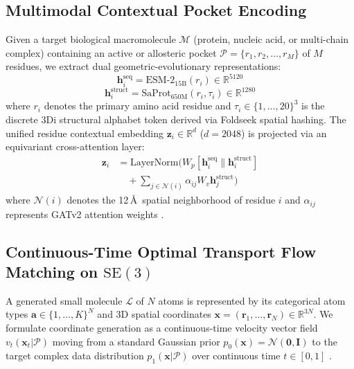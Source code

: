 \documentclass[10pt,journal,compsoc]{IEEEtran}
\begin{document}
\subsection{Multimodal Contextual Pocket Encoding}
Given a target biological macromolecule $\mathcal{M}$ (protein, nucleic acid, or multi-chain complex) containing an active or allosteric pocket $\mathcal{P} = \{r_1, r_2, \dots, r_M\}$ of $M$ residues, we extract dual geometric-evolutionary representations:
\begin{equation}
\mathbf{h}_i^{\text{seq}} = \text{ESM-2}_{15\text{B}}(r_i) \in \mathbb{R}^{5120}
\label{eq:esm_embed}
\end{equation}
\begin{equation}
\mathbf{h}_i^{\text{struct}} = \text{SaProt}_{650\text{M}}(r_i, \tau_i) \in \mathbb{R}^{1280}
\label{eq:saprot_embed}
\end{equation}
where $r_i$ denotes the primary amino acid residue and $\tau_i \in \{1, \dots, 20\}^3$ is the discrete 3Di structural alphabet token derived via Foldseek spatial hashing. The unified residue contextual embedding $\mathbf{z}_i \in \mathbb{R}^{d}$ ($d = 2048$) is projected via an equivariant cross-attention layer:
\begin{equation}
\begin{split}
\mathbf{z}_i &= \text{LayerNorm}\Big( W_p [\mathbf{h}_i^{\text{seq}} \parallel \mathbf{h}_i^{\text{struct}}] \\
&\quad + \sum_{j \in \mathcal{N}(i)} \alpha_{ij} W_v \mathbf{h}_j^{\text{struct}} \Big)
\end{split}
\label{eq:unified_pocket_embed}
\end{equation}
where $\mathcal{N}(i)$ denotes the 12\,\AA\ spatial neighborhood of residue $i$ and $\alpha_{ij}$ represents GATv2 attention weights \cite{brody2022attentive}.

\subsection{Continuous-Time Optimal Transport Flow Matching on $\mathrm{SE}(3)$}
A generated small molecule $\mathcal{L}$ of $N$ atoms is represented by its categorical atom types $\mathbf{a} \in \{1, \dots, K\}^N$ and 3D spatial coordinates $\mathbf{x} = (\mathbf{r}_1, \dots, \mathbf{r}_N) \in \mathbb{R}^{3N}$. We formulate coordinate generation as a continuous-time velocity vector field $v_t(\mathbf{x}_t | \mathcal{P})$ moving from a standard Gaussian prior $p_0(\mathbf{x}) = \mathcal{N}(\mathbf{0}, \mathbf{I})$ to the target complex data distribution $p_1(\mathbf{x} | \mathcal{P})$ over continuous time $t \in [0, 1]$ \cite{lipman2023flow,albergo2023building}.
\end{document}
